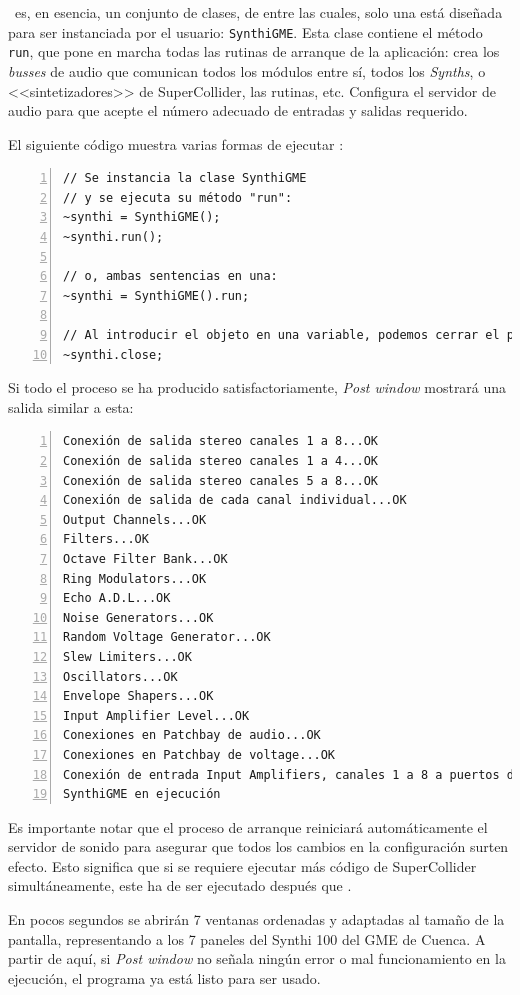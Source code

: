 \appName~es, en esencia, un conjunto de clases, de entre las cuales, solo una está diseñada para ser instanciada por el usuario: \texttt{SynthiGME}. Esta clase contiene el método \texttt{run}, que pone en marcha todas las rutinas de arranque de la aplicación: crea los \textit{busses} de audio que comunican todos los módulos entre sí, todos los \textit{Synths}, o <<sintetizadores>> de SuperCollider, las rutinas, etc. Configura el servidor de audio para que acepte el número adecuado de entradas y salidas requerido.

El siguiente código muestra varias formas de ejecutar \appName:
\begin{lstlisting}[style=SuperCollider-IDE, frame=single,  numbers=left]
// Se instancia la clase SynthiGME
// y se ejecuta su método "run":
~synthi = SynthiGME();
~synthi.run();

// o, ambas sentencias en una:
~synthi = SynthiGME().run;

// Al introducir el objeto en una variable, podemos cerrar el programa ejecutando el método "close":
~synthi.close;
\end{lstlisting}

Si todo el proceso se ha producido satisfactoriamente, \textit{Post window} mostrará una salida similar a esta:

\begin{lstlisting}[frame=single, numbers=left]
Conexión de salida stereo canales 1 a 8...OK
Conexión de salida stereo canales 1 a 4...OK
Conexión de salida stereo canales 5 a 8...OK
Conexión de salida de cada canal individual...OK
Output Channels...OK
Filters...OK
Octave Filter Bank...OK
Ring Modulators...OK
Echo A.D.L...OK
Noise Generators...OK
Random Voltage Generator...OK
Slew Limiters...OK
Oscillators...OK
Envelope Shapers...OK
Input Amplifier Level...OK
Conexiones en Patchbay de audio...OK
Conexiones en Patchbay de voltage...OK
Conexión de entrada Input Amplifiers, canales 1 a 8 a puertos de SC...OK
SynthiGME en ejecución
\end{lstlisting}



Es importante notar que el proceso de arranque reiniciará automáticamente el servidor de sonido para asegurar que todos los cambios en la configuración surten efecto. Esto significa que si se requiere ejecutar más código de SuperCollider simultáneamente, este ha de ser ejecutado después que \appName. 

En pocos segundos se abrirán 7 ventanas ordenadas y adaptadas al tamaño de la pantalla, representando a los 7 paneles del Synthi 100 del GME de Cuenca. A partir de aquí, si \textit{Post window} no señala ningún error o mal funcionamiento en la ejecución, el programa ya está listo para ser usado.




